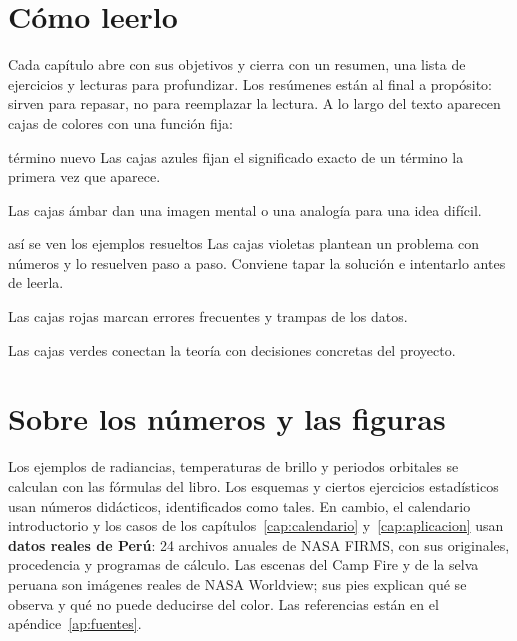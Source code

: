\section*{Cómo leerlo}

Cada capítulo abre con sus objetivos y cierra con un resumen, una lista de ejercicios y lecturas
para profundizar. Los resúmenes están al final a propósito: sirven para repasar, no para
reemplazar la lectura. A lo largo del texto aparecen cajas de colores con una función fija:

\begin{definicion}{término nuevo}
Las cajas azules fijan el significado exacto de un término la primera vez que aparece.
\end{definicion}

\begin{intuicion}
Las cajas ámbar dan una imagen mental o una analogía para una idea difícil.
\end{intuicion}

\begin{ejemplo}{así se ven los ejemplos resueltos}
Las cajas violetas plantean un problema con números y lo resuelven paso a paso.
\solucion Conviene tapar la solución e intentarlo antes de leerla.
\end{ejemplo}

\begin{atencion}
Las cajas rojas marcan errores frecuentes y trampas de los datos.
\end{atencion}

\begin{parareto}
Las cajas verdes conectan la teoría con decisiones concretas del proyecto.
\end{parareto}

\section*{Sobre los números y las figuras}

Los ejemplos de radiancias, temperaturas de brillo y periodos orbitales se calculan
con las fórmulas del libro. Los esquemas y ciertos ejercicios estadísticos usan números
didácticos, identificados como tales. En cambio, el calendario introductorio y los
casos de los capítulos~\ref{cap:calendario} y~\ref{cap:aplicacion} usan \textbf{datos reales
de Perú}: 24 archivos anuales de NASA FIRMS, con sus originales, procedencia y programas
de cálculo. Las escenas del Camp Fire y de la selva peruana son imágenes reales de
NASA Worldview; sus pies explican qué se observa y qué no puede deducirse del color.
Las referencias están en el apéndice~\ref{ap:fuentes}.

